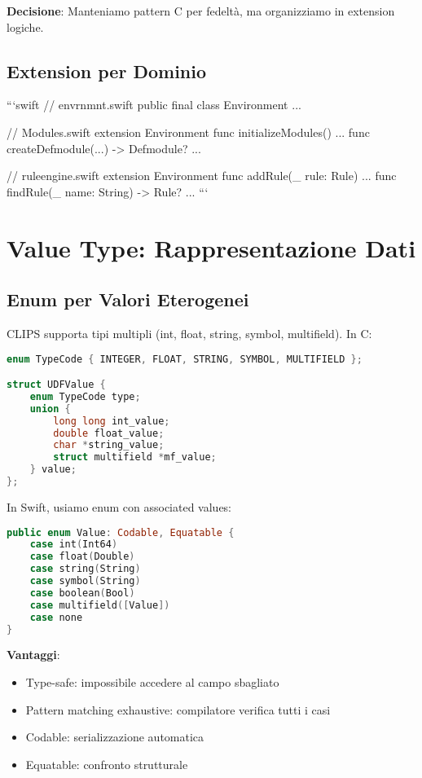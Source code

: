 \textbf{Decisione}: Manteniamo pattern C per fedeltà, ma organizziamo in extension logiche.

\subsection{Extension per Dominio}

```swift
// envrnmnt.swift
public final class Environment { ... }

// Modules.swift
extension Environment {
    func initializeModules() { ... }
    func createDefmodule(...) -> Defmodule? { ... }
}

// ruleengine.swift
extension Environment {
    func addRule(_ rule: Rule) { ... }
    func findRule(_ name: String) -> Rule? { ... }
}
```

\section{Value Type: Rappresentazione Dati}

\subsection{Enum per Valori Eterogenei}

CLIPS supporta tipi multipli (int, float, string, symbol, multifield). In C:

\begin{lstlisting}[language=C]
enum TypeCode { INTEGER, FLOAT, STRING, SYMBOL, MULTIFIELD };

struct UDFValue {
    enum TypeCode type;
    union {
        long long int_value;
        double float_value;
        char *string_value;
        struct multifield *mf_value;
    } value;
};
\end{lstlisting}

In Swift, usiamo enum con associated values:

\begin{lstlisting}[language=Swift]
public enum Value: Codable, Equatable {
    case int(Int64)
    case float(Double)
    case string(String)
    case symbol(String)
    case boolean(Bool)
    case multifield([Value])
    case none
}
\end{lstlisting}

\textbf{Vantaggi}:
\begin{itemize}
\item Type-safe: impossibile accedere al campo sbagliato
\item Pattern matching exhaustive: compilatore verifica tutti i casi
\item Codable: serializzazione automatica
\item Equatable: confronto strutturale
\end{itemize}


